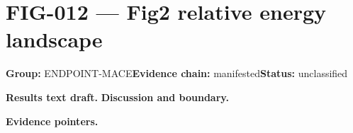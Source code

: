 \clearpage
\section{FIG-012 --- Fig2 relative energy landscape}
\label{figpage:fig-012}
\textbf{Group:} ENDPOINT-MACE\quad \textbf{Evidence chain:} manifested\quad \textbf{Status:} unclassified

\textbf{Results text draft.} 
\textbf{Discussion and boundary.} 


\textbf{Evidence pointers.}



\vfill
